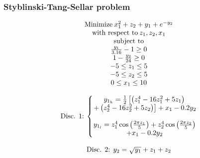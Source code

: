 \documentclass[conf]{new-aiaa}
\begin{document}
\subsubsection{Styblinski-Tang-Sellar problem}
\begin{equation}
    \begin{matrix}
    \textnormal{Minimize} \: x_1^2+z_2+y_1+e^{-y_2} \\
    \textnormal{with respect to} \: z_1,z_2,x_1 \\
    \textnormal{subject to}  \\
    \frac{y_1}{3.16}-1\geq 0  \\
    1-\frac{y_2}{24}\geq 0 \\
    -5\leq z_1 \leq 5 \\
    -5\leq z_2 \leq 5 \\
    0\leq x_1 \leq 10 \\
    \\
    \textnormal{Disc. 1:} \: \left\{\begin{matrix} 
     y_{1_h}=\frac{1}{2}\left[\left(z_1^4-16z_1^2+5z_1\right) \right. \\ \left.+\left(z_2^4-16z_2^2+5z_2 \right) \right]+x_1-0.2y_2 \\
    \\
    y_{1_l}=z_1^4\cos\left(\frac{2\pi z_1}{5}\right)+z_2^4\cos\left(\frac{2\pi z_2}{5}\right)\\ +x_1-0.2y_2
    \end{matrix} \right. \\
    \\
    \textnormal{Disc. 2:} \:\: y_2=\sqrt{y_1}+z_1+z_2\\
    \end{matrix}
\end{equation}
\end{document}
